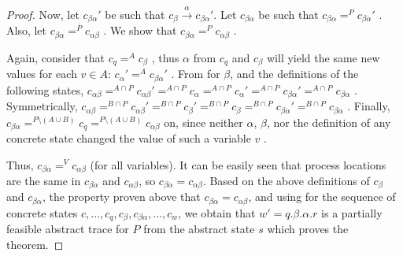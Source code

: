 \documentclass[numbook]{svjour3}
\begin{document}
\begin{proof}
	Now, let $c_{\beta\alpha}'$ be such that $c_\beta \xrightarrow{\alpha} c_{\beta\alpha}'$. Let $c_{\beta\alpha}$ be such that $c_{\beta\alpha} =^P c_{\beta\alpha}'$ . Also, let $c_{\beta\alpha} =^{\overline{P}} c_{\alpha\beta}$ . We show that $c_{\beta\alpha} =^P c_{\alpha\beta}$ .
	
	Again, consider that $c_q =^A c_\beta$ , thus $\alpha$ from $c_q$ and $c_\beta$ will yield the same new values for each $v \in A$: $c_\alpha' =^A c_{\beta\alpha}'$ . From  for $\beta$, and the definitions of the following states, $c_{\alpha\beta} =^{A \cap P} c_{\alpha\beta}' =^{A \cap P} c_\alpha =^{A \cap P} c_\alpha' =^{A \cap P} c_{\beta\alpha}' =^{A \cap P} c_{\beta\alpha}$ . Symmetrically, $c_{\alpha\beta} =^{B \cap P} c_{\alpha\beta}' =^{B \cap P} c_\beta' =^{B \cap P} c_\beta =^{B \cap P} c_{\beta\alpha}' =^{B \cap P} c_{\beta\alpha}$ . Finally, $c_{\beta\alpha} =^{P \setminus (A \cup B)} c_q =^{P \setminus (A \cup B)} c_{\alpha\beta}$ on, since neither $\alpha$, $\beta$, nor the definition of any concrete state changed the value of such a variable $v$ .
	
	Thus, $c_{\beta\alpha} =^V c_{\alpha\beta}$ (for all variables). It can be easily seen that process locations are the same in $c_{\beta\alpha}$ and $c_{\alpha\beta}$, so $c_{\beta\alpha} = c_{\alpha\beta}$. Based on the above definitions of $c_\beta$ and $c_{\beta\alpha}$, the property proven above that $c_{\beta\alpha} = c_{\alpha\beta}$, and using  for the sequence of concrete states $c, ..., c_q, c_\beta, c_{\beta\alpha}, ..., c_w$, we obtain that $w' = q.\beta.\alpha.r$ is a partially feasible abstract trace for $P$ from the abstract state $s$ which proves the theorem.
\end{proof}
\end{document}

